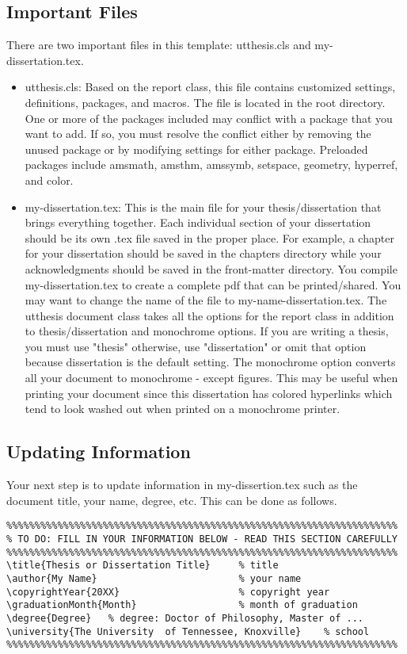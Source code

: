 \subsection{Important Files}
There are two important files in this template: utthesis.cls and my-dissertation.tex.
\begin{itemize}

\item
utthesis.cls: Based on the report class, this file contains customized settings, definitions, packages, and macros. The file is located in the root directory. One or more of the packages included may conflict with a package that you want to add. If so, you must resolve the conflict either by removing the unused package or by modifying settings for either package. Preloaded packages include amsmath, amsthm, amssymb, setspace, geometry, hyperref, and color.

\item
my-dissertation.tex: This is the main file for your thesis/dissertation that brings everything together. Each individual section of your dissertation should be its own .tex file saved in the proper place. For example, a chapter for your dissertation should be saved in the chapters directory while your acknowledgments should be saved in the front-matter directory. You compile my-dissertation.tex to create a complete pdf that can be printed/shared. You may want to change the name of the file to my-name-dissertation.tex. The utthesis document class takes all the options for the report class in addition to thesis/dissertation and monochrome options. If you are writing a thesis, you must use "thesis" otherwise, use "dissertation" or omit that option because dissertation is the default setting. The monochrome option converts all your document to monochrome - except figures. This may be useful when printing your document since this dissertation has colored hyperlinks which tend to look washed out when printed on a monochrome printer. 
\end{itemize}


\subsection{Updating Information}
Your next step is to update information in my-dissertion.tex such as the document title, your name, degree, etc. 
This can be done as follows.

\begin{verbatim}
%%%%%%%%%%%%%%%%%%%%%%%%%%%%%%%%%%%%%%%%%%%%%%%%%%%%%%%%%%%%%%%%%%%%%
% TO DO: FILL IN YOUR INFORMATION BELOW - READ THIS SECTION CAREFULLY
%%%%%%%%%%%%%%%%%%%%%%%%%%%%%%%%%%%%%%%%%%%%%%%%%%%%%%%%%%%%%%%%%%%%%
\title{Thesis or Dissertation Title}	 % title 
\author{My Name}                         % your name
\copyrightYear{20XX}            		 % copyright year 
\graduationMonth{Month}           	     % month of graduation 
\degree{Degree}   % degree: Doctor of Philosophy, Master of ...
\university{The University  of Tennessee, Knoxville}	% school 
%%%%%%%%%%%%%%%%%%%%%%%%%%%%%%%%%%%%%%%%%%%%%%%%%%%%%%%%%%%%%%%%%%%%%
\end{verbatim}

